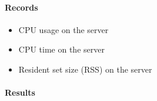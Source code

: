 \documentclass[12pt]{article}
\begin{document}
\paragraph{Records}
\begin{itemize}
\item CPU usage on the server
\item CPU time on the server
\item Resident set size (RSS) on the server
\end{itemize}

\paragraph{Results}\mbox{}\\\\
\end{document}

